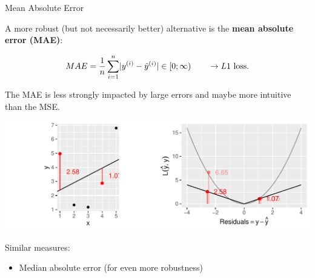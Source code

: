 \documentclass[11pt,compress,t,notes=noshow, xcolor=table]{beamer}
\newenvironment{knitrout}{}{} %
\begin{document}

\begin{vbframe}{Mean Absolute Error}

A more robust (but not necessarily better) alternative is the 
\textbf{mean absolute error (MAE)}:

$$ 
MAE = \frac{1}{n} \sum\limits_{i=1}^n \rvert y^{(i)} - \hat{y}^{(i)} \rvert \in [0;\infty) \qquad \rightarrow L1 
\text{ loss}.
$$

\begin{minipage}[c]{0.33\textwidth}
  \raggedright
  \small
  The MAE is less strongly impacted by large errors and maybe more 
  intuitive than the MSE.
\end{minipage}%
\begin{minipage}[c]{0.67\textwidth}
  \begin{knitrout}\scriptsize
  \color{fgcolor}
  {\includegraphics[width=\textwidth]{figure/plot_abs_loss}}
\end{knitrout}
\end{minipage}

\small
Similar measures:

\begin{itemize}
  \small
  \item Median absolute error (for even more robustness)
\end{itemize}

\end{vbframe}

\end{document}
